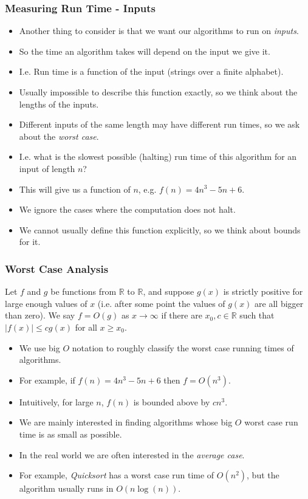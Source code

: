 \documentclass[handout]{beamer}
\newcommand{\ra}{\rightarrow}
\begin{document}
\begin{frame}
\frametitle{Measuring Run Time - Inputs}
\begin{itemize}
\item Another thing to consider is that we want our algorithms to run on \emph{inputs}.
\item So the time an algorithm takes will depend on the input we give it. 
\item I.e. Run time is a function of the input (strings over a finite alphabet). 
\item Usually impossible to describe this function exactly, so we think about the lengths of the inputs.
\item Different inputs of the same length may have different run times, so we ask about the \emph{worst case}.  
\item I.e. what is the slowest possible (halting) run time of this algorithm for an input of length $n$? 
\item This will give us a function of $n$, e.g. $f(n)=4n^3-5n +6$.
\item We ignore the cases where the computation does not halt.
\item We cannot usually define this function explicitly, so we think about bounds for it.
\end{itemize}
\end{frame}

\begin{frame}
\frametitle{Worst Case Analysis}
\begin{definition}
Let $f$ and $g$ be functions from $\mathbb{R}$ to $\mathbb{R}$, and suppose $g(x)$ is strictly positive for large enough values of $x$ (i.e. after some point the values of $g(x)$ are all bigger than zero). We say $f=O(g)$ as $x\ra\infty$ if there are $x_0,c\in\mathbb{R}$ such that $|f(x)|\leq cg(x)$ for all $x\geq x_0$. 
\end{definition}
\begin{itemize}
\item We use big $O$ notation to roughly classify the worst case running times of algorithms. 
\item For example, if $f(n)=4n^3-5n +6$ then $f=O(n^3)$. 
\item Intuitively, for large $n$,  $f(n)$ is bounded above by $cn^3$. 
\item We are mainly interested in finding algorithms whose big $O$ worst case run time is as small as possible. 
\item In the real world we are often interested in the \emph{average case}. 
\item For example, \emph{Quicksort} has a worst case run time of $O(n^2)$, but the algorithm usually runs in $O(n\log(n))$. 
\end{itemize}
\end{frame}
\end{document}
